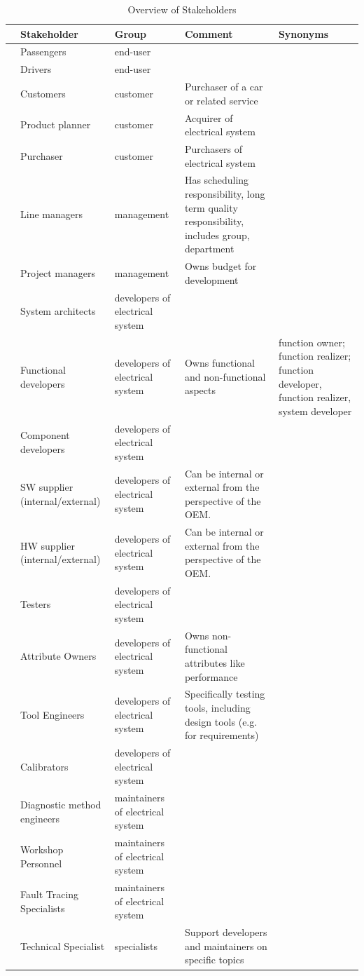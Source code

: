 \begin{table}[htb]
\scriptsize
\caption{Overview of Stakeholders}
\label{tab:stakeholders}
\begin{tabular}{rv{0.14\textwidth}v{0.2\textwidth}v{0.26\textwidth}v{0.2\textwidth}}
\toprule
& \textbf{Stakeholder} &	\textbf{Group} & \textbf{Comment} & \textbf{Synonyms} \tabularnewline
\midrule
& Passengers & end-user	\tabularnewline
\hline
& Drivers & end-user		\tabularnewline
\hline
& Customers & customer & Purchaser of a car or related service & \tabularnewline
\hline
& Product planner & customer & Acquirer of electrical system		\tabularnewline
\hline
& Purchaser & customer & Purchasers of electrical system		\tabularnewline
\hline
& Line managers & management & Has scheduling responsibility, long term quality responsibility, includes group, department	\tabularnewline
\hline
& Project managers & management & Owns budget for development	\tabularnewline
\hline
& System architects & developers of electrical system & 	\tabularnewline
\hline
& Functional developers & developers of electrical system & Owns functional and non-functional aspects & function owner; function realizer; function developer, function realizer, system developer\tabularnewline
\hline
& Component developers & developers of electrical system		\tabularnewline
\hline
& SW supplier (internal/external) & developers of electrical system	& Can be internal or external from the perspective of the OEM.	\tabularnewline
\hline
& HW supplier (internal/external) & developers of electrical system	& Can be internal or external from the perspective of the OEM.	\tabularnewline
\hline
& Testers & developers of electrical system		\tabularnewline
\hline
& Attribute Owners & developers of electrical system & Owns non-functional attributes like performance	\tabularnewline
\hline
& Tool Engineers & developers of electrical system & Specifically testing tools, including design tools (e.g. for requirements)	\tabularnewline
\hline
& Calibrators & developers of electrical system & \tabularnewline
\hline
& Diagnostic method engineers & maintainers of electrical system		\tabularnewline
\hline
& Workshop Personnel & maintainers of electrical system		\tabularnewline
\hline
& Fault Tracing Specialists & maintainers of electrical system		\tabularnewline
\hline
& Technical Specialist &  specialists &	Support developers and maintainers on specific topics \tabularnewline
\bottomrule
\end{tabular}
\end{table}

